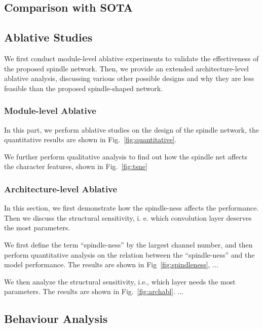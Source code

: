 \subsection{Comparison with SOTA}


\subsection{Ablative Studies}
We first conduct module-level ablative experiments to validate the effectiveness of the proposed spindle network. Then, we provide an extended architecture-level ablative analysis, discussing various other possible designs and why they are less feasible than the proposed spindle-shaped network.  

\subsubsection{Module-level Ablative}



In this part, we perform ablative studies on the design of the spindle network, the quantitative results are shown in Fig.~\ref{fig:quantitative}.%


We further perform qualitative analysis to find out how the spindle net affects the character features, shown in Fig.~\ref{fig:tsne}  



\subsubsection{Architecture-level Ablative}
In this section, we first demonstrate how the spindle-ness affects the performance. Then we discuss the structural sensitivity, i. e. which convolution layer deserves the most parameters.

We first define the term ``spindle-ness'' by the largest channel number, %
and then perform quantitative analysis on the relation between the ``spindle-ness'' and the model performance.
The results are shown in Fig~\ref{fig:spindleness}, ... %


We then analyze the structural sensitivity, i.e., which layer needs the most parameters. The results are shown in Fig.~\ref{fig:archabl}. ... %

\subsection{Behaviour Analysis}

